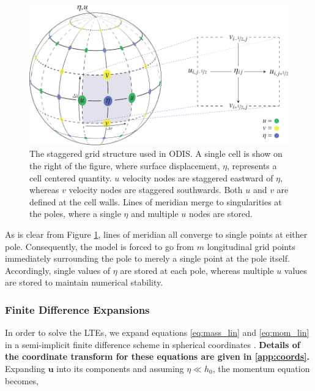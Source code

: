 \begin{figure}[t]
\centering
\includegraphics[width=0.8\linewidth]{Figures/GridDiagram}
\caption{The staggered grid structure used in ODIS. A single cell is show on the right of the figure, where surface displacement, $\eta$, represents a cell centered quantity. $u$ velocity nodes are staggered eastward of $\eta$, whereas $v$ velocity nodes are staggered southwards. Both $u$ and $v$ are defined at the cell walls. Lines of meridian merge to singularities at the poles, where a single $\eta$ and multiple $u$ nodes are stored.\label{fig:grid}}
\end{figure}

As is clear from Figure \ref{fig:grid}, lines of meridian all converge to single points at either pole. Consequently, the model is forced to go from $m$ longitudinal grid points immediately surrounding the pole to merely a single point at the pole itself. Accordingly, single values of $\eta$ are stored at each pole, whereas multiple $u$ values are stored to maintain numerical stability. 

\subsubsection{Finite Difference Expansions \label{subsec:fd_expan}}

In order to solve the LTEs, we expand equations \ref{eq:mass_lin} and \ref{eq:mom_lin} in a semi-implicit finite difference scheme in spherical coordinates \citep{sears1995tidal}. \textbf{Details of the coordinate transform for these equations are given in \ref{app:coords}.} Expanding $\bm{u}$ into its components and assuming $\eta \ll h_0$, the momentum equation becomes,

